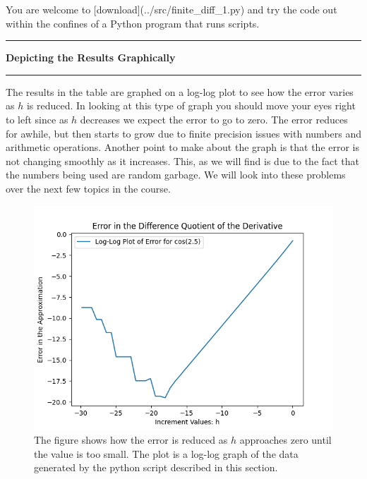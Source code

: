 \documentclass[10pt,fleqn]{article}
\begin{document}
You are welcome to [download](../src/finite\_diff\_1.py) and try the code out
within the confines of a Python program that runs scripts.
\vskip0.1in\hrule\vskip0.1in \noindent
{\bf Depicting the Results Graphically}
\vskip0.1in\hrule\vskip0.1in \noindent
The results in the table are graphed on a log-log plot to see how the error
varies as \(h\) is reduced. In looking at this type of graph you should move
your eyes right to left since as \(h\) decreases we expect the error to go to
zero. The error reduces for awhile, but then starts to grow due to finite
precision issues with numbers and arithmetic operations. Another point to make
about the graph is that the error is not changing smoothly as it increases.
This, as we will find is due to the fact that the numbers being used are random
garbage. We will look into these problems over the next few topics in the
course.
\vfill
\begin{figure}[h]
\centering
\includegraphics{../images/diff_quotient_01.png}
\vskip0.1in
\caption{The figure shows how the error is reduced as \(h\) approaches zero
until the value is too small. The plot is a log-log graph of the data generated
by the python script described in this section.}
\end{figure}
\eject
\end{document}
